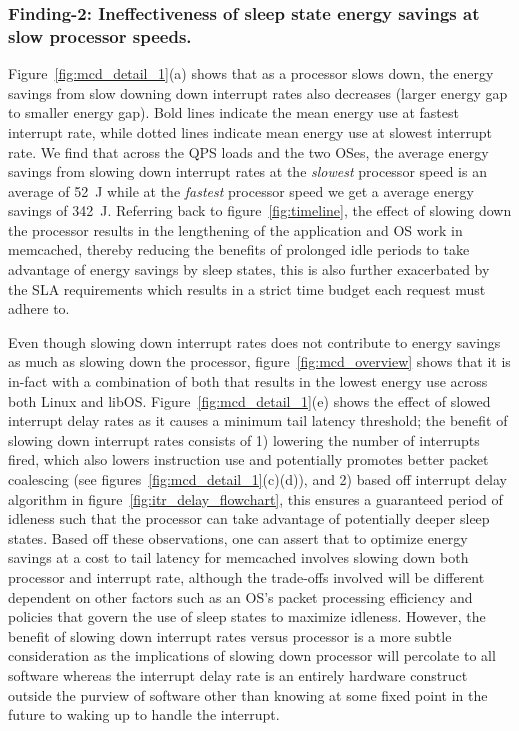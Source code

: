 \subsubsection{Finding-2: Ineffectiveness of sleep state energy savings at slow processor speeds.}
\label{sec:f2}
Figure~\ref{fig:mcd_detail_1}(a) shows that as a processor slows down, the energy savings from slow downing down interrupt rates also decreases (larger energy gap to smaller energy gap). Bold lines indicate the mean energy use at fastest interrupt rate, while dotted lines indicate mean energy use at slowest interrupt rate. We find that across the QPS loads and the two OSes, the average energy savings from slowing down interrupt rates at the \textit{slowest} processor speed is an average of \SI{52}{\joule} while at the \textit{fastest} processor speed we get a average energy savings of \SI{342}{\joule}. Referring back to figure~\ref{fig:timeline}, the effect of slowing down the processor results in the lengthening of the application and OS work in memcached, thereby reducing the benefits of prolonged idle periods to take advantage of energy savings by sleep states, this is also further exacerbated by the SLA requirements which results in a strict time budget each request must adhere to. 

Even though slowing down interrupt rates does not contribute to energy savings as much as slowing down the processor, figure~\ref{fig:mcd_overview} shows that it is in-fact with a combination of both that results in the lowest energy use across both Linux and libOS. Figure~\ref{fig:mcd_detail_1}(e) shows the effect of slowed interrupt delay rates as it causes a minimum tail latency threshold; the benefit of slowing down interrupt rates consists of 1) lowering the number of interrupts fired, which also lowers instruction use and potentially promotes better packet coalescing (see figures~\ref{fig:mcd_detail_1}(c)(d)), and 2) based off interrupt delay algorithm in figure~\ref{fig:itr_delay_flowchart}, this ensures a guaranteed period of idleness such that the processor can take advantage of potentially deeper sleep states. Based off these observations, one can assert that to optimize energy savings at a cost to tail latency for memcached involves slowing down both processor and interrupt rate, although the trade-offs involved will be different dependent on other factors such as an OS's packet processing efficiency and policies that govern the use of sleep states to maximize idleness. However, the benefit of slowing down interrupt rates versus processor is a more subtle consideration as the implications of slowing down processor will percolate to all software whereas the interrupt delay rate is an entirely hardware construct outside the purview of software other than knowing at some fixed point in the future to waking up to handle the interrupt.

